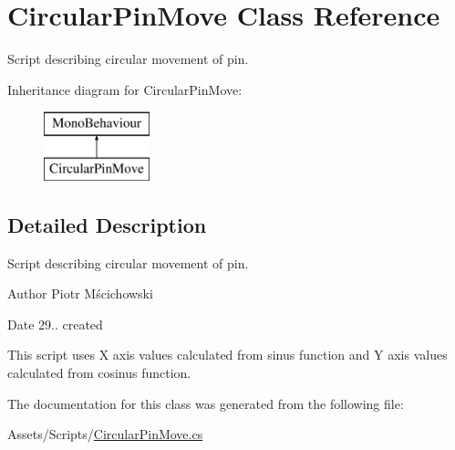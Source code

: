 \hypertarget{class_circular_pin_move}{}\section{Circular\+Pin\+Move Class Reference}
\label{class_circular_pin_move}


Script describing circular movement of pin.  


Inheritance diagram for Circular\+Pin\+Move\+:\begin{figure}[H]
\begin{center}
\leavevmode
\includegraphics[height=2.000000cm]{class_circular_pin_move}
\end{center}
\end{figure}


\subsection{Detailed Description}
Script describing circular movement of pin. 

\begin{DoxyAuthor}{Author}
Piotr Mścichowski 
\end{DoxyAuthor}
\begin{DoxyDate}{Date}
29.. created
\end{DoxyDate}
This script uses X axis values calculated from sinus function and Y axis values calculated from cosinus function. 

The documentation for this class was generated from the following file\+:\begin{DoxyCompactItemize}
\item 
Assets/\+Scripts/\hyperlink{_circular_pin_move_8cs}{Circular\+Pin\+Move.\+cs}\end{DoxyCompactItemize}
